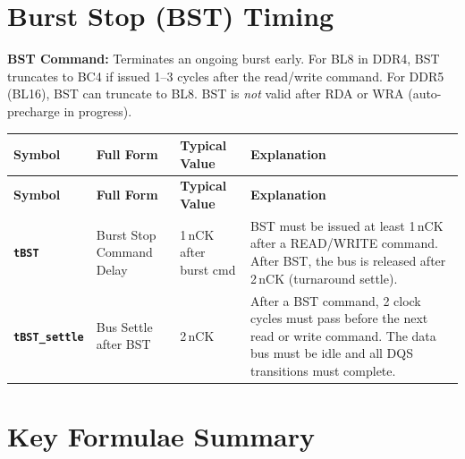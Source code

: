 \documentclass[11pt,a4paper]{article}
\newcommand{\sym}[1]{\texttt{\textbf{#1}}}
\begin{document}
\section{Burst Stop (BST) Timing}

\begin{notebox}
\textbf{BST Command:} Terminates an ongoing burst early. For BL8 in DDR4, BST truncates 
to BC4 if issued 1--3 cycles after the read/write command. For DDR5 (BL16), BST can 
truncate to BL8. BST is \textit{not} valid after RDA or WRA (auto-precharge in progress).
\end{notebox}

\begin{longtable}{L{2.2cm} L{4.8cm} L{3.5cm} L{4cm}}
\toprule
\textbf{Symbol} & \textbf{Full Form} & \textbf{Typical Value} & \textbf{Explanation} \\
\midrule
\endfirsthead
\toprule
\textbf{Symbol} & \textbf{Full Form} & \textbf{Typical Value} & \textbf{Explanation} \\
\midrule
\endhead
\bottomrule
\endfoot

\sym{tBST} & Burst Stop Command Delay & 1\,nCK after burst cmd &
  BST must be issued at least 1\,nCK after a READ/WRITE command.
  After BST, the bus is released after 2\,nCK (turnaround settle). \\

\sym{tBST\_settle} & Bus Settle after BST & 2\,nCK &
  After a BST command, 2 clock cycles must pass before the next read or write command.
  The data bus must be idle and all DQS transitions must complete. \\
\end{longtable}

\section{Key Formulae Summary}
\end{document}
